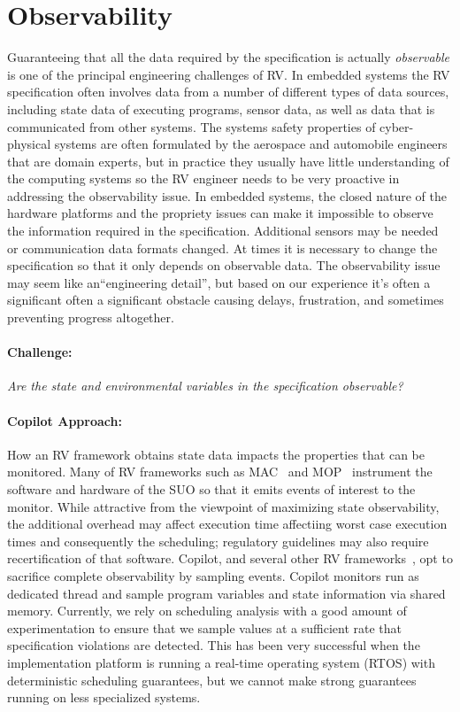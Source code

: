 \section{Observability}\label{sec:observ} 
Guaranteeing that all the data required by the specification is
actually \emph{observable} is one of the principal engineering
challenges of RV. In embedded systems the RV specification often
involves data from a number of different types of data sources,
including state data of executing programs, sensor data, as well as
data that is communicated from other systems.  The systems safety
properties of cyber-physical systems are often formulated by the
aerospace and automobile engineers that are domain experts, but in
practice they usually have little understanding of the computing
systems so the RV engineer needs to be very proactive in addressing
the observability issue. In embedded systems, the closed nature of the
hardware platforms and the propriety issues can make it impossible to
observe the information required in the specification.  Additional
sensors may be needed or communication data formats changed.  At times
it is necessary to change the specification so that it only depends on
observable data.  The observability issue may seem like
an``engineering detail'', but based on our experience it's often a
significant often a significant obstacle causing delays, frustration,
and sometimes preventing progress altogether.


\paragraph{Challenge:} \emph{Are the state and environmental variables in the
specification  observable?}  


  \paragraph{Copilot Approach:} How an RV framework obtains state data impacts the properties that
  can be monitored. Many of RV frameworks such as MAC~\cite{KimLKS04}
  and MOP~\cite{ChenR05} instrument the software and hardware of the
  SUO so that it emits events of interest to the monitor.  While
  attractive from the viewpoint of maximizing state observability, the
  additional overhead may affect execution time affectiing worst case
  execution times and consequently the scheduling; 
  regulatory guidelines may  also require recertification of that software.
  Copilot, and several other RV frameworks~\cite{sampling,Kane15,borzoo}, opt to sacrifice complete
  observability by sampling events.  Copilot monitors run as dedicated
  thread and sample program variables and state information via shared
  memory.  Currently, we rely on scheduling analysis with a good
  amount of experimentation to ensure that we sample values at a
  sufficient rate that specification violations are detected. This has
  been very successful when the implementation platform is running a
  real-time operating system (RTOS) with deterministic scheduling
  guarantees, but we cannot make strong guarantees running on less
  specialized systems.

